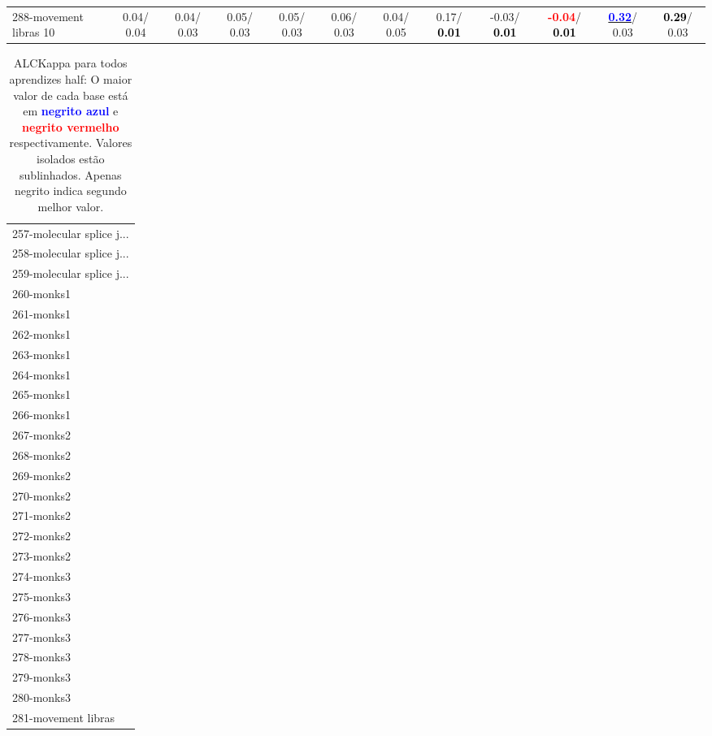 \begin{table}[h]
\begin{center}
{\begin{tabular}{lc|c|c|c|c|c|c|c|c|c|c}
288-movement libras 10 &   0.04/  0.04 &   0.04/  0.03 &   0.05/  0.03 &   0.05/  0.03 &   0.06/  0.03 &   0.04/  0.05 &   0.17/\textcolor{black}{\textbf{  0.01}} &  -0.03/\textcolor{black}{\textbf{  0.01}} & \textcolor{red}{\textbf{ -0.04}}/\textcolor{black}{\textbf{  0.01}} & \underline{\textcolor{blue}{\textbf{  0.32}}}/  0.03 & \textcolor{black}{\textbf{  0.29}}/  0.03 \\\end{tabular}}\label{stratsALCKappa8AllReduxHalfa}
\end{center}
\end{table}
\begin{table}[h]
\caption{ALCKappa para todos aprendizes half: O maior valor de cada base está em \textcolor{blue}{\textbf{negrito azul}} e \textcolor{red}{\textbf{negrito vermelho}} respectivamente. Valores isolados estão sublinhados. Apenas negrito indica segundo melhor valor.}
\begin{center}\begin{tabular}{l}
 & \\ \hline 257-molecular splice j... &  \\
258-molecular splice j... &  \\
259-molecular splice j... &  \\
260-monks1 &  \\
261-monks1 &  \\
262-monks1 &  \\
263-monks1 &  \\ \hline
264-monks1 &  \\
265-monks1 &  \\
266-monks1 &  \\
267-monks2 &  \\
268-monks2 &  \\
269-monks2 &  \\
270-monks2 &  \\ \hline
271-monks2 &  \\
272-monks2 &  \\
273-monks2 &  \\
274-monks3 &  \\
275-monks3 &  \\
276-monks3 &  \\
277-monks3 &  \\ \hline
278-monks3 &  \\
279-monks3 &  \\
280-monks3 &  \\
281-movement libras &  \\

\end{tabular}
\end{center}
\end{table}
